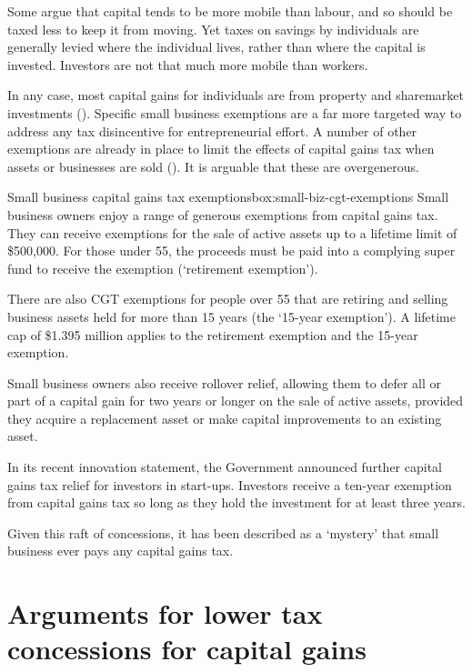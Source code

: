 Some argue that capital tends to be more mobile than labour, and so should be taxed less to keep it from moving. Yet taxes on savings by individuals are generally levied where the individual lives, rather than where the capital is invested. Investors are not that much more mobile than workers.

In any case, most capital gains for individuals are from property and sharemarket investments (). Specific small business exemptions are a far more targeted way to address any tax disincentive for entrepreneurial effort. A number of other exemptions are already in place to limit the effects of capital gains tax when assets or businesses are sold (). It is arguable that these are overgenerous. 

\begin{smallbox}{Small business capital gains tax exemptions}{box:small-biz-cgt-exemptions}
Small business owners enjoy a range of generous exemptions from capital gains tax.  
They can receive exemptions for the sale of active assets up to a lifetime limit of \$500,000. For those under 55, the proceeds must be paid into a complying super fund to receive the exemption (‘retirement exemption’). 

There are also CGT exemptions for people over 55 that are retiring and selling business assets held for more than 15 years (the ‘15\nobreakdash-year exemption’). A lifetime cap of \$1.395 million applies to the retirement exemption and the 15-year exemption. 

Small business owners also receive rollover relief, allowing them to defer all or part of a capital gain for two years or longer on the sale of active assets, provided they acquire a replacement asset or make capital improvements to an existing asset.

In its recent innovation statement, the Government announced further capital gains tax relief for investors in start-ups. Investors receive a ten-year exemption from capital gains tax so long as they hold the investment for at least three years.

Given this raft of concessions, it has been described as a ‘mystery’ that small business ever pays any capital gains tax.

\end{smallbox}


\section{Arguments for lower tax concessions for capital gains}\label{subsec:arguments-lower-tax-concessions-for-capital-gains}

